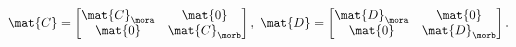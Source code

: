 \begin{example}
\begin{equation}
    \end{equation}
    \begin{equation}\label{eq:LTI-stacking-mor2}
        \mat{C}=\begin{bmatrix}
            \mat{C}_\mora & \mat{0}       \\
            \mat{0}       & \mat{C}_\morb
        \end{bmatrix},\
        \mat{D}=\begin{bmatrix}
            \mat{D}_\mora & \mat{0}       \\
            \mat{0}       & \mat{D}_\morb
        \end{bmatrix}.
    \end{equation}

\end{example}


